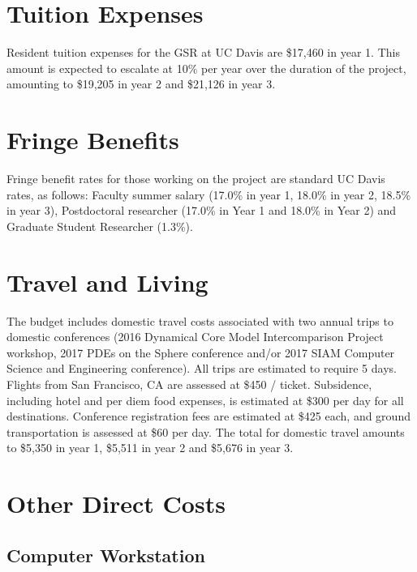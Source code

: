 \documentclass[11pt]{article}
\begin{document}
\section{Tuition Expenses}
\vspace{-0.3cm}

Resident tuition expenses for the GSR at UC Davis are \$17,460 in year 1.  This amount is expected to escalate at 10\% per year over the duration of the project, amounting to \$19,205 in year 2 and \$21,126 in year 3.

\section{Fringe Benefits}
\vspace{-0.3cm}

Fringe benefit rates for those working on the project are standard UC Davis rates, as follows:  Faculty summer salary (17.0\% in year 1, 18.0\% in year 2, 18.5\% in year 3), Postdoctoral researcher (17.0\% in Year 1 and 18.0\% in Year 2) and Graduate Student Researcher (1.3\%).

\section{Travel and Living}
\vspace{-0.3cm}

The budget includes domestic travel costs associated with two annual trips to domestic conferences (2016 Dynamical Core Model Intercomparison Project workshop, 2017 PDEs on the Sphere conference and/or 2017 SIAM Computer Science and Engineering conference).  All trips are estimated to require 5 days.  Flights from San Francisco, CA are assessed at \$450 / ticket.  Subsidence, including hotel and per diem food expenses, is estimated at \$300 per day for all destinations.  Conference registration fees are estimated at \$425 each, and ground transportation is assessed at \$60 per day.  The total for domestic travel amounts to \$5,350 in year 1, \$5,511 in year 2 and \$5,676 in year 3.

\section{Other Direct Costs}
\vspace{-0.3cm}

\subsection{Computer Workstation}
\end{document}
